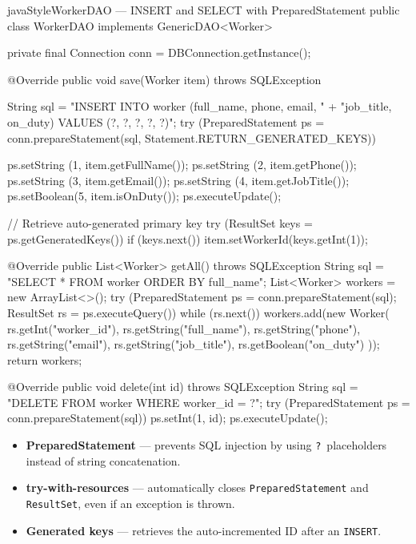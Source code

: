 \documentclass[12pt, a4paper]{report}
\begin{document}
\begin{codeblock}{javaStyle}{WorkerDAO --- INSERT and SELECT with PreparedStatement}
public class WorkerDAO implements GenericDAO<Worker> {
    private final Connection conn = DBConnection.getInstance();

    @Override
    public void save(Worker item) throws SQLException {
        String sql = "INSERT INTO worker (full_name, phone, email, "
                   + "job_title, on_duty) VALUES (?, ?, ?, ?, ?)";
        try (PreparedStatement ps = conn.prepareStatement(sql,
                Statement.RETURN_GENERATED_KEYS)) {
            ps.setString (1, item.getFullName());
            ps.setString (2, item.getPhone());
            ps.setString (3, item.getEmail());
            ps.setString (4, item.getJobTitle());
            ps.setBoolean(5, item.isOnDuty());
            ps.executeUpdate();

            // Retrieve auto-generated primary key
            try (ResultSet keys = ps.getGeneratedKeys()) {
                if (keys.next())
                    item.setWorkerId(keys.getInt(1));
            }
        }
    }

    @Override
    public List<Worker> getAll() throws SQLException {
        String sql = "SELECT * FROM worker ORDER BY full_name";
        List<Worker> workers = new ArrayList<>();
        try (PreparedStatement ps = conn.prepareStatement(sql);
             ResultSet rs = ps.executeQuery()) {
            while (rs.next()) {
                workers.add(new Worker(
                    rs.getInt("worker_id"),
                    rs.getString("full_name"),
                    rs.getString("phone"),
                    rs.getString("email"),
                    rs.getString("job_title"),
                    rs.getBoolean("on_duty")
                ));
            }
        }
        return workers;
    }

    @Override
    public void delete(int id) throws SQLException {
        String sql = "DELETE FROM worker WHERE worker_id = ?";
        try (PreparedStatement ps = conn.prepareStatement(sql)) {
            ps.setInt(1, id);
            ps.executeUpdate();
        }
    }
}
\end{codeblock}

\begin{tcolorbox}[notebox, title={JDBC Best Practices Shown}]
\begin{itemize}[noitemsep]
    \item \textbf{PreparedStatement} --- prevents SQL injection by using \texttt{?}~placeholders instead of string concatenation.
    \item \textbf{try-with-resources} --- automatically closes \texttt{PreparedStatement} and \texttt{ResultSet}, even if an exception is thrown.
    \item \textbf{Generated keys} --- retrieves the auto-incremented ID after an \texttt{INSERT}.
\end{itemize}
\end{tcolorbox}
\end{document}
